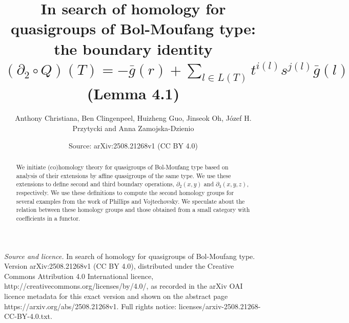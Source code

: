 \documentclass[10pt,a4paper]{amsart}
\title[Homology of quasigroups of Bol-Moufang type]{In search of homology for quasigroups of Bol-Moufang type: the boundary identity $(\partial_2 \circ Q)(T) = - \bar{g}(r) + \sum_{l \in L(T)} t^{i(l)} s^{j(l)}\bar{g}(l)$ (Lemma 4.1)}
\author{Anthony Christiana, Ben Clingenpeel, Huizheng Guo, Jinseok Oh, J\'{o}zef H. Przytycki and Anna Zamojska-Dzienio}
\date{Source: arXiv:2508.21268v1 (CC BY 4.0)}
\theoremstyle{definition}
\begin{document}
\begin{abstract}
We initiate (co)homology theory for quasigroups of Bol-Moufang type based on analysis of their extensions by affine quasigroups of the same type. We use these extensions to define second and third boundary operations, $\partial_2(x,y)$ and $\partial_3(x,y,z)$, respectively. We use these definitions to compute the second homology groups for several examples from the work of Phillips and Vojtechovsky. We speculate about the relation between these homology groups and those obtained from a small category with coefficients in a functor.
\end{abstract}
\maketitle

\noindent\emph{Source and licence.} In search of homology for quasigroups of Bol-Moufang type. Version arXiv:2508.21268v1 (CC BY 4.0), distributed under the Creative Commons Attribution 4.0 International licence, http://creativecommons.org/licenses/by/4.0/, as recorded in the arXiv OAI licence metadata for this exact version and shown on the abstract page https://arxiv.org/abs/2508.21268v1. Full rights notice: licenses/arxiv-2508.21268-CC-BY-4.0.txt.\par\smallskip
\end{document}
